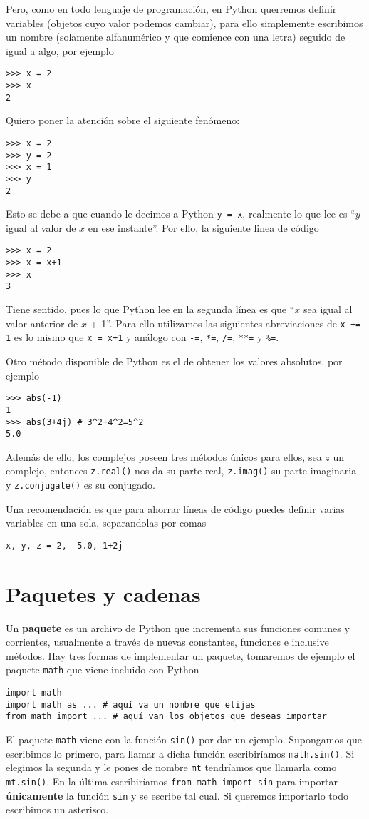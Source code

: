 \documentclass[11pt,twoside]{report}
\begin{document}
Pero, como en todo lenguaje de programación, en Python querremos definir variables (objetos cuyo valor podemos cambiar), para ello simplemente escribimos un nombre (solamente alfanumérico y que comience con una letra) seguido de igual a algo, por ejemplo
\begin{lstlisting}
>>> x = 2
>>> x
2
\end{lstlisting}
Quiero poner la atención sobre el siguiente fenómeno:
\begin{lstlisting}
>>> x = 2
>>> y = 2
>>> x = 1
>>> y
2
\end{lstlisting}
Esto se debe a que cuando le decimos a Python \lstinline|y = x|, realmente lo que lee es ``$y$ igual al valor de $x$ en ese instante''. Por ello, la siguiente linea de código
\begin{lstlisting}
>>> x = 2
>>> x = x+1
>>> x
3
\end{lstlisting}
Tiene sentido, pues lo que Python lee en la segunda línea es que ``$x$ sea igual al valor anterior de $x$ + 1''. Para ello utilizamos las siguientes abreviaciones de \lstinline|x += 1| es lo mismo que \lstinline|x = x+1| y análogo con \lstinline|-=|, \lstinline|*=|, \lstinline|/=|, \lstinline|**=| y 
\lstinline|%=|.

Otro método disponible de Python es el de obtener los valores absolutos, por ejemplo
\begin{lstlisting}
>>> abs(-1)
1
>>> abs(3+4j) # 3^2+4^2=5^2
5.0
\end{lstlisting}
Además de ello, los complejos poseen tres métodos únicos para ellos, sea $z$ un complejo, entonces \lstinline|z.real()| nos da su parte real, \lstinline|z.imag()| su parte imaginaria y \lstinline|z.conjugate()| es su conjugado.

Una recomendación es que para ahorrar líneas de código puedes definir varias variables en una sola, separandolas por comas
\begin{lstlisting}
x, y, z = 2, -5.0, 1+2j
\end{lstlisting}

\section{Paquetes y cadenas}
Un \textbf{paquete} es un archivo de Python que incrementa sus funciones comunes y corrientes, usualmente a través de nuevas constantes, funciones e inclusive métodos. Hay tres formas de implementar un paquete, tomaremos de ejemplo el paquete \lstinline|math| que viene incluido con Python
\begin{lstlisting}
import math
import math as ... # aquí va un nombre que elijas
from math import ... # aquí van los objetos que deseas importar
\end{lstlisting}
El paquete \lstinline|math| viene con la función \lstinline|sin()| por dar un ejemplo. Supongamos que escribimos lo primero, para llamar a dicha función escribiríamos \lstinline|math.sin()|. Si elegimos la segunda y le pones de nombre \lstinline|mt| tendríamos que llamarla como \lstinline|mt.sin()|. En la última escribiríamos \lstinline|from math import sin| para importar \textbf{únicamente} la función \lstinline|sin| y se escribe tal cual. Si queremos importarlo todo escribimos un asterisco.
\end{document}
